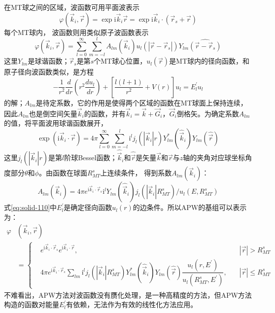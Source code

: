{在MT球之间的区域，波函数可用平面波表示
\begin{equation}
	\varphi(\vec k_i,\vec r)=\exp\mathrm{i}\vec k_i\vec r=\exp\mathrm{i}\vec k_i\cdot(\vec r_s+\vec r)
  \label{eq:solid-111}
\end{equation}
每个MT球内，%
波函数则用类似原子波函数表示
\begin{equation}
  \varphi(\vec k_i,\vec r)=\sum_{l=0}^{\infty}\sum_{m=-l}^lA_{lm}(\vec k_i)u_l(|\vec r-\vec r_s|)Y_{lm}\widehat{(\vec r-\vec r_s)}
  \label{eq:solid-109}
\end{equation}
这里$Y_{lm}$是球谐函数；$\vec r_s$是第$s$个MT球心位置，$u_l(\vec r)$是MT球内的径向函数，和原子径向波函数类似，是方程
\begin{equation}
  -\frac1{r^2}\frac d{dr}\left(r^2\frac{du_l}{dr}\right)+\left[\frac{l(l+1)}{r^2}+V(r)\right]u_l=E_l^{\prime}u_l
  \label{eq:solid-110}
\end{equation}
的解；$A_{lm}$是待定系数，它的作用是使得两个区域的函数在MT球面上保持连续，因此$A_{lm}$也是倒空间矢量$\vec k_i$的函数，并有$\vec k_i=\vec k+\vec G_i$，$\vec G_i$倒格矢。为确定系数$A_{lm}$的值，将平面波用球谐函数展开，
\begin{equation}
	\exp(\mathrm{i}\vec k_i\cdot\vec r)=4\pi\sum_{l=0}^{\infty}\sum_{m=-l}^l\mathrm{i}^lj_l(|\vec k_i|r)Y_{lm}^{\ast}(\hat{\vec k}_i)Y_{lm}(\hat{\vec r})
  \label{eq:solid-112}
\end{equation}
这里$j_l(|\vec k_i|r)$是第$l$阶球Bessel函数；$\hat{\vec k}_i$和$\hat{\vec r}$是矢量$\vec k$和$\vec r$与$z$轴的夹角对应球坐标角度部分$\theta$和$\phi$。由函数在球面$R_{MT}^s$上连续条件，%
得到系数$A_{lm}(\vec k_i)$：
$$A_{lm}(\vec k_i)=4\pi e^{\mathrm{i}\vec k_i\cdot\vec r_s}\mathrm{i}^lY_{lm}(\hat{\vec k}_i)j_l(|\vec k_i|R_{MT}^s)/u_l(E,R_{MT}^s)$$
式\eqref{eq:solid-110}中$E_l^{\prime}$是确定径向函数$u_l(r)$的边条件。所以APW的基组可以表示为：
\begin{equation}
  \begin{split}
    \varphi&(\vec k_i,\vec r)\\
    &=\left\{\begin{aligned}
	    &e^{\mathrm{i}\vec k_i\cdot\vec r_s}e^{\mathrm{i}\vec k_i\cdot\vec r},&|\vec r|>R_{MT}^s\\
	    &4\pi e^{\mathrm{i}\vec k_i\cdot\vec r_s}\sum_{lm}\mathrm{i}^lj_l(|\vec k_i|R_{MT}^s)Y_{lm}^{\ast}(\hat{\vec k}_i)Y_{lm}(\hat{\vec r})\dfrac{u_l(r,E^{\prime})}{u_l(R_{MT}^s,E^{\prime})},\quad&|\vec r|\leqslant R_{MT}^s
    \end{aligned} \right.
  \end{split}
  \label{eq:solid-113}
\end{equation}
不难看出，APW方法对波函数没有赝化处理，是一种高精度的方法，但APW方法构造的函数对能量$E_l^{\prime}$有依赖，无法作为有效的线性化方法应用。

}
